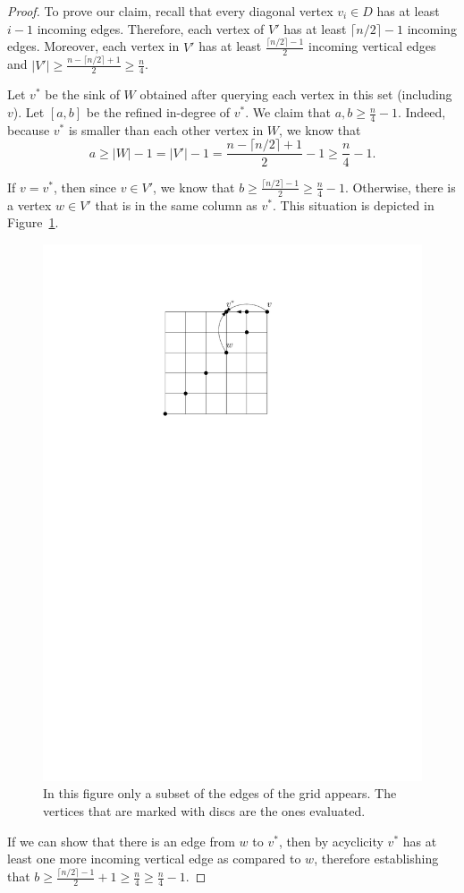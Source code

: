\documentclass[a4paper,10pt]{article}
\newcommand{\indegree}{refined in-degree\xspace}
\begin{document}
\begin{proof}
To prove our claim, recall that every diagonal vertex $v_i \in D$ has at least $i - 1$ incoming edges.  
Therefore, each vertex of $V'$ has at least $\lceil n/2 \rceil - 1$ incoming edges. 
Moreover, each vertex in $V'$ has at least $\frac{\lceil n/2\rceil-1}{2}$ incoming vertical edges and $|V'| \geq \frac{n-\lceil n/2\rceil + 1}{2} \geq \frac{n}{4}$. 

Let $v^*$ be the sink of $W$ obtained after querying each vertex in this set (including $v$). Let $[a,b]$ be the \indegree of $v^*$. We claim that $a, b \geq \frac{n}{4} - 1$. 
Indeed, because $v^*$ is smaller than each other vertex in $W$, we know that $$a \geq |W|-1 = |V'|-1 = \frac{n-\lceil n/2\rceil + 1}{2} - 1 \geq \frac{n}{4} - 1.$$


If $v = v^*$, then since $v\in V'$, we know that $b\geq \frac{\lceil n/2\rceil-1}{2}\geq \frac{n}{4} - 1$.
Otherwise, there is a vertex $w \in V'$ that is in the same column as $v^*$.
  This situation is depicted in Figure~\ref{fig:seedlem1}.
  \begin{figure}[htbp] 
  	\centering
  	\includegraphics[scale=0.7]{seedlemma_fig1.pdf}
  	\caption{In this figure only a subset of the edges of the grid appears. The vertices that are marked with discs are the ones evaluated.} 
  	\label{fig:seedlem1}
  \end{figure}
   If we can show that there is an edge from $w$ to $v^*$, then by acyclicity $v^*$ has at least one more incoming vertical edge as compared to $w$, therefore establishing that $b \geq \frac{\lceil n/2\rceil-1}{2} + 1 \geq \frac{n}{4} \geq \frac{n}{4} - 1$. 
   

\end{proof}
\end{document}
